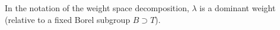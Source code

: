 In the notation of the weight space decomposition, $\lambda$ is a dominant weight (relative to a fixed Borel subgroup $B \supset T$).
